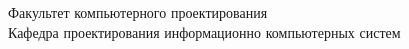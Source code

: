 \documentclass[a4paper,emptystyle]{bsuir-std}
\begin{document}
\ESKDtheColumnI

\ESKDtheColumnII

\ESKDtheColumnIII
\newline
Факультет компьютерного проектирования \\
Кафедра проектирования информационно компьютерных систем
\newpage
\lipsum[1]
\end{document}
